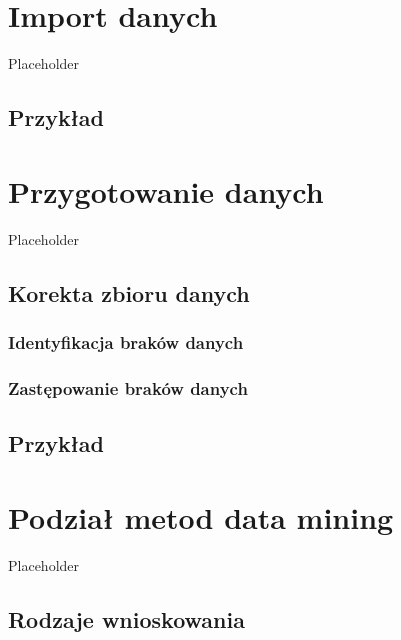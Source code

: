 \documentclass[]{book}
\theoremstyle{plain}
\theoremstyle{definition}
\begin{document}
\hypertarget{roz1}{%
\chapter{Import danych}\label{roz1}}

Placeholder

\hypertarget{przyk1}{%
\section{Przykład}\label{przyk1}}

\hypertarget{przygotowanie-danych}{%
\chapter{Przygotowanie danych}\label{przygotowanie-danych}}

Placeholder

\hypertarget{korekta-zbioru-danych}{%
\section{Korekta zbioru danych}\label{korekta-zbioru-danych}}

\hypertarget{identyfikacja-brakow-danych}{%
\subsection{Identyfikacja braków danych}\label{identyfikacja-brakow-danych}}

\hypertarget{zastepowanie-brakow-danych}{%
\subsection{Zastępowanie braków danych}\label{zastepowanie-brakow-danych}}

\hypertarget{przyk21}{%
\section{Przykład}\label{przyk21}}

\hypertarget{podzia-metod-data-mining}{%
\chapter{Podział metod data mining}\label{podzia-metod-data-mining}}

Placeholder

\hypertarget{rodzaje-wnioskowania}{%
\section{Rodzaje wnioskowania}\label{rodzaje-wnioskowania}}
\end{document}
